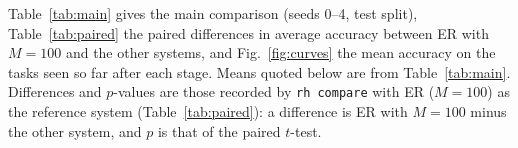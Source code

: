 Table~\ref{tab:main} gives the main comparison (seeds 0--4, test split), Table~\ref{tab:paired} the paired differences in average accuracy between ER with $M{=}100$ and the other systems, and Fig.~\ref{fig:curves} the mean accuracy on the tasks seen so far after each stage. Means quoted below are from Table~\ref{tab:main}. Differences and $p$-values are those recorded by \texttt{rh compare} with ER ($M{=}100$) as the reference system (Table~\ref{tab:paired}): a difference is ER with $M{=}100$ minus the other system, and $p$ is that of the paired $t$-test.

\begin{table}[t]\centering\caption{Main results on the test split, mean $\pm$ std over 5 seeds (seeds 0--4). EWC uses the validation-selected $\lambda$ per scenario; experience replay is shown at $M{=}20$ and $M{=}100$. Bold: best printed mean in the scenario (all tied systems are bold); underline: runner-up, shown only when the best is not tied. Joint training is the upper-bound reference, and its backward transfer compares networks retrained from scratch.}\label{tab:main}

\end{table}

